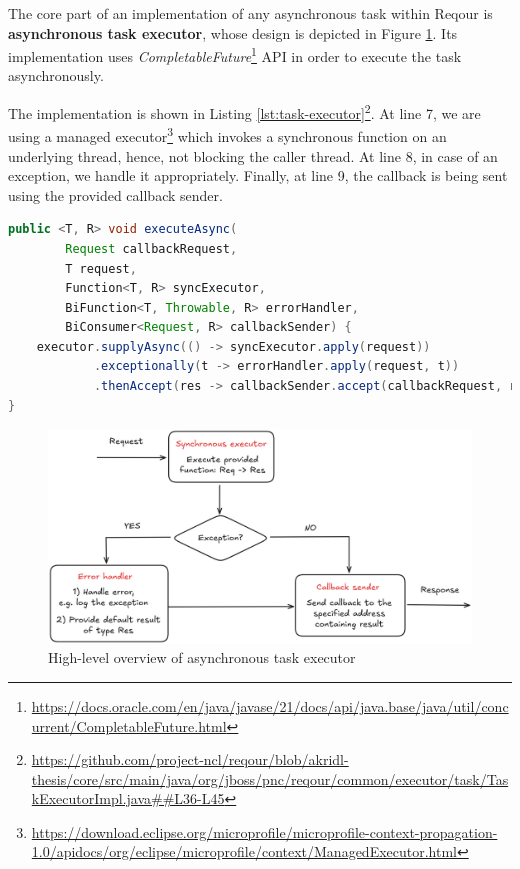 \documentclass[../main.tex]{subfiles}
\begin{document}
The core part of an implementation of any asynchronous task within Reqour is \textbf{asynchronous task executor}, whose design is depicted in Figure \ref{fig:task-executor}. Its implementation uses \textit{CompletableFuture}\footnote{\url{https://docs.oracle.com/en/java/javase/21/docs/api/java.base/java/util/concurrent/CompletableFuture.html}} API in order to execute the task asynchronously.

The implementation is shown in Listing \ref{lst:task-executor}\footnote{\url{https://github.com/project-ncl/reqour/blob/akridl-thesis/core/src/main/java/org/jboss/pnc/reqour/common/executor/task/TaskExecutorImpl.java##L36-L45}}. At line 7, we are using a managed executor\footnote{\url{https://download.eclipse.org/microprofile/microprofile-context-propagation-1.0/apidocs/org/eclipse/microprofile/context/ManagedExecutor.html}} which invokes a synchronous function on an underlying thread, hence, not blocking the caller thread. At line 8, in case of an exception, we handle it appropriately. Finally, at line 9, the callback is being sent using the provided callback sender.

\begin{lstlisting}[language=Java, caption=Asynchronous task executor, label={lst:task-executor}]
public <T, R> void executeAsync(
        Request callbackRequest,
        T request,
        Function<T, R> syncExecutor,
        BiFunction<T, Throwable, R> errorHandler,
        BiConsumer<Request, R> callbackSender) {
    executor.supplyAsync(() -> syncExecutor.apply(request))
            .exceptionally(t -> errorHandler.apply(request, t))
            .thenAccept(res -> callbackSender.accept(callbackRequest, res));
}
\end{lstlisting}

\begin{figure}
  \begin{center}
    \includegraphics[width=\textwidth]{images/task-executor.png}
  \end{center}
  \caption{High-level overview of asynchronous task executor}
  \label{fig:task-executor}
\end{figure}
\end{document}
